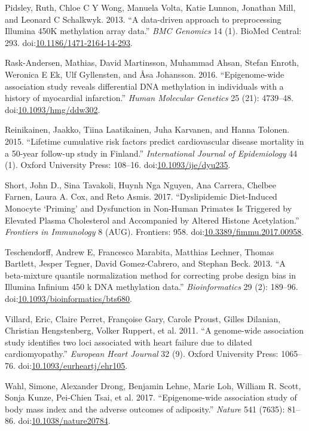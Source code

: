 \documentclass[]{article}
\theoremstyle{definition}
\theoremstyle{definition}
\theoremstyle{definition}
\theoremstyle{remark}
\begin{document}
Pidsley, Ruth, Chloe C {Y Wong}, Manuela Volta, Katie Lunnon, Jonathan
Mill, and Leonard C Schalkwyk. 2013. ``A data-driven approach to
preprocessing Illumina 450K methylation array data.'' \emph{BMC
Genomics} 14 (1). BioMed Central: 293.
doi:\href{http://dx.doi.org/10.1186/1471-2164-14-293}{10.1186/1471-2164-14-293}.

Rask-Andersen, Mathias, David Martinsson, Muhammad Ahsan, Stefan Enroth,
Weronica E Ek, Ulf Gyllensten, and {Å}sa Johansson. 2016.
``Epigenome-wide association study reveals differential DNA methylation
in individuals with a history of myocardial infarction.'' \emph{Human
Molecular Genetics} 25 (21): 4739--48.
doi:\href{http://dx.doi.org/10.1093/hmg/ddw302}{10.1093/hmg/ddw302}.

Reinikainen, Jaakko, Tiina Laatikainen, Juha Karvanen, and Hanna
Tolonen. 2015. ``Lifetime cumulative risk factors predict cardiovascular
disease mortality in a 50-year follow-up study in Finland.''
\emph{International Journal of Epidemiology} 44 (1). Oxford University
Press: 108--16.
doi:\href{http://dx.doi.org/10.1093/ije/dyu235}{10.1093/ije/dyu235}.

Short, John D., Sina Tavakoli, Huynh Nga Nguyen, Ana Carrera, Chelbee
Farnen, Laura A. Cox, and Reto Asmis. 2017. ``Dyslipidemic Diet-Induced
Monocyte `Priming' and Dysfunction in Non-Human Primates Is Triggered by
Elevated Plasma Cholesterol and Accompanied by Altered Histone
Acetylation.'' \emph{Frontiers in Immunology} 8 (AUG). Frontiers: 958.
doi:\href{http://dx.doi.org/10.3389/fimmu.2017.00958}{10.3389/fimmu.2017.00958}.

Teschendorff, Andrew E, Francesco Marabita, Matthias Lechner, Thomas
Bartlett, Jesper Tegner, David Gomez-Cabrero, and Stephan Beck. 2013.
``A beta-mixture quantile normalization method for correcting probe
design bias in Illumina Infinium 450 k DNA methylation data.''
\emph{Bioinformatics} 29 (2): 189--96.
doi:\href{http://dx.doi.org/10.1093/bioinformatics/bts680}{10.1093/bioinformatics/bts680}.

Villard, Eric, Claire Perret, Fran{ç}oise Gary, Carole Proust, Gilles
Dilanian, Christian Hengstenberg, Volker Ruppert, et al. 2011. ``A
genome-wide association study identifies two loci associated with heart
failure due to dilated cardiomyopathy.'' \emph{European Heart Journal}
32 (9). Oxford University Press: 1065--76.
doi:\href{http://dx.doi.org/10.1093/eurheartj/ehr105}{10.1093/eurheartj/ehr105}.

Wahl, Simone, Alexander Drong, Benjamin Lehne, Marie Loh, William R.
Scott, Sonja Kunze, Pei-Chien Tsai, et al. 2017. ``Epigenome-wide
association study of body mass index and the adverse outcomes of
adiposity.'' \emph{Nature} 541 (7635): 81--86.
doi:\href{http://dx.doi.org/10.1038/nature20784}{10.1038/nature20784}.
\end{document}
